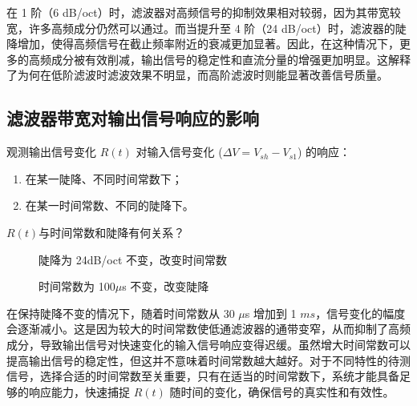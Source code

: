 \documentclass[dvipsnames, svgnames,a4paper,11pt]{article}
\begin{document}
		在 1 阶（6 dB/oct）时，滤波器对高频信号的抑制效果相对较弱，因为其带宽较宽，许多高频成分仍然可以通过。而当提升至 4 阶（24 dB/oct）时，滤波器的陡降增加，使得高频信号在截止频率附近的衰减更加显著。因此，在这种情况下，更多的高频成分被有效削减，输出信号的稳定性和直流分量的增强更加明显。这解释了为何在低阶滤波时滤波效果不明显，而高阶滤波时则能显著改善信号质量。
	\subsection{滤波器带宽对输出信号响应的影响}
	观测输出信号变化 \( R(t) \) 对输入信号变化 (\( \Delta V = V_{sh} - V_{s1} \)) 的响应：

	\begin{enumerate}
		\item 在某一陡降、不同时间常数下；
		\item 在某一时间常数、不同的陡降下。
	\end{enumerate}
	
	
	\begin{question}
		$R(t)$与时间常数和陡降有何关系？
	\end{question}
	\begin{figure}[htbp]
		\centering
		\quad
		\quad
		\quad
		\quad
		\caption{陡降为 24dB/oct 不变，改变时间常数}
		\label{陡降为 24dB/oct 不变，改变时间常数}
		\end{figure}

	\begin{figure}[htbp]
		\centering
		\quad
		\quad
		\quad
		\quad
		\caption{时间常数为 100$\mu$s 不变，改变陡降}
		\label{时间常数为 100us 不变，改变陡降}
		\end{figure}	
		在保持陡降不变的情况下，随着时间常数从 30 $\mu$s 增加到 1 $ms$，信号变化的幅度会逐渐减小。这是因为较大的时间常数使低通滤波器的通带变窄，从而抑制了高频成分，导致输出信号对快速变化的输入信号响应变得迟缓。虽然增大时间常数可以提高输出信号的稳定性，但这并不意味着时间常数越大越好。对于不同特性的待测信号，选择合适的时间常数至关重要，只有在适当的时间常数下，系统才能具备足够的响应能力，快速捕捉 \( R(t) \) 随时间的变化，确保信号的真实性和有效性。
\end{document}
